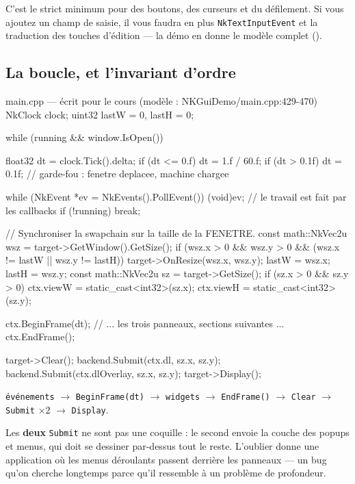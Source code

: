 C'est le strict minimum pour des boutons, des curseurs et du défilement. Si vous
ajoutez un champ de saisie, il vous faudra en plus \texttt{NkTextInputEvent} et
la traduction des touches d'édition — la démo en donne le modèle complet
().

\subsection{La boucle, et l'invariant d'ordre}

\begin{nkcode}{main.cpp — écrit pour le cours (modèle : NKGuiDemo/main.cpp:429-470)}
    NkClock clock;
    uint32 lastW = 0, lastH = 0;

    while (running && window.IsOpen()) {
        float32 dt = clock.Tick().delta;
        if (dt <= 0.f)  dt = 1.f / 60.f;
        if (dt > 0.1f)  dt = 0.1f;          // garde-fou : fenetre deplacee, machine chargee

        while (NkEvent *ev = NkEvents().PollEvent()) {
            (void)ev;                        // le travail est fait par les callbacks
        }
        if (!running)
            break;

        // Synchroniser la swapchain sur la taille de la FENETRE.
        const math::NkVec2u wsz = target->GetWindow().GetSize();
        if (wsz.x > 0 && wsz.y > 0 && (wsz.x != lastW || wsz.y != lastH)) {
            target->OnResize(wsz.x, wsz.y);
            lastW = wsz.x;
            lastH = wsz.y;
        }
        const math::NkVec2u sz = target->GetSize();
        if (sz.x > 0 && sz.y > 0) {
            ctx.viewW = static_cast<int32>(sz.x);
            ctx.viewH = static_cast<int32>(sz.y);
        }

        ctx.BeginFrame(dt);
        // ... les trois panneaux, sections suivantes ...
        ctx.EndFrame();

        target->Clear();
        backend.Submit(ctx.dl, sz.x, sz.y);
        backend.Submit(ctx.dlOverlay, sz.x, sz.y);
        target->Display();
    }
\end{nkcode}

\begin{nkretenir}
\texttt{événements} $\rightarrow$ \texttt{BeginFrame(dt)} $\rightarrow$
\texttt{widgets} $\rightarrow$ \texttt{EndFrame()} $\rightarrow$ \texttt{Clear}
$\rightarrow$ \texttt{Submit} $\times 2$ $\rightarrow$ \texttt{Display}.

Les \textbf{deux} \texttt{Submit} ne sont pas une coquille : le second envoie la
couche des popups et menus, qui doit se dessiner par-dessus tout le reste.
L'oublier donne une application où les menus déroulants passent derrière les
panneaux — un bug qu'on cherche longtemps parce qu'il ressemble à un problème de
profondeur.
\end{nkretenir}

